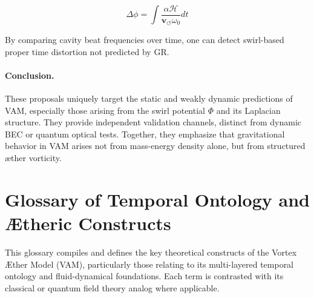 \documentclass[preprint]{revtex4-2}
\begin{document}
            \begin{equation}
                \Delta \phi = \int \frac{\alpha \mathcal{H}}{\mathbf{v}_{\scriptscriptstyle\boldsymbol{\circlearrowleft}} \omega_0} dt
            \end{equation}
        
            By comparing cavity beat frequencies over time, one can detect swirl-based proper time distortion not predicted by GR.
        
            \paragraph{Conclusion.} These proposals uniquely target the static and weakly dynamic predictions of VAM, especially those arising from the swirl potential \( \Phi \) and its Laplacian structure. They provide independent validation channels, distinct from dynamic BEC or quantum optical tests. Together, they emphasize that gravitational behavior in VAM arises not from mass-energy density alone, but from structured æther vorticity.

        \section{Glossary of Temporal Ontology and Ætheric Constructs}\label{sec:glossary}
            This glossary compiles and defines the key theoretical constructs of the Vortex \AE{}ther Model (VAM), particularly those relating to its multi-layered temporal ontology and fluid-dynamical foundations. Each term is contrasted with its classical or quantum field theory analog where applicable.
        
\end{document}
